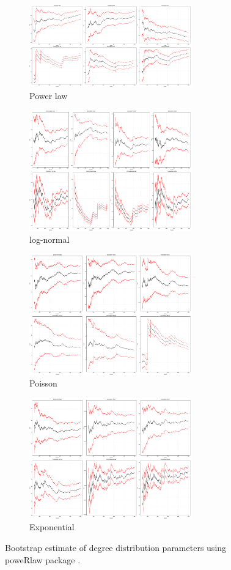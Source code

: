 \begin{figure}
  \begin{subfigure}{7cm}
    \centering\includegraphics[width=7cm]{images/chapter3/poweRlaw/bootstrap_params/bootstrap_powerlaw_params_5000_iters.png}
    \caption{Power law}
    \end{subfigure}
  \begin{subfigure}{7cm}
    \centering\includegraphics[width=7cm]{images/chapter3/poweRlaw/bootstrap_params/log_normal_bs_params.png}
    \caption{log-normal}
  \end{subfigure}
  \begin{subfigure}{7cm}
    \centering\includegraphics[width=7cm]{images/chapter3/poweRlaw/bootstrap_params/poisson_bootstrap_params.png}
    \caption{Poisson}
  \end{subfigure}
  \begin{subfigure}{7cm}
    \centering\includegraphics[width=7cm]{images/chapter3/poweRlaw/bootstrap_params/bootstrap_exp_params.png}
    \caption{Exponential}
  \end{subfigure}
  \caption[\textbf{Bootstrap estimate of degree distribution parameters}]{Bootstrap estimate of degree distribution parameters using poweRlaw package \cite{gillespie2015fitting}. }
  \label{fig:bootstrap_params}
\end{figure}


